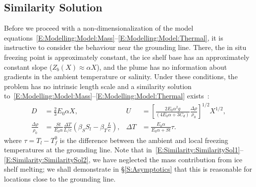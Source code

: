\documentclass[openacc]{rsproca_new}%
\begin{document}
\subsection{Similarity Solution}\label{S:Model:SimilaritySolution}
Before we proceed with a non-dimensionalization of the model equations~\eqref{E:Modelling:Model:Mass}--\eqref{E:Modelling:Model:Thermal}, it is instructive to consider the behaviour near the grounding line. There, the in situ freezing point is approximately constant, the ice shelf base has an approximately constant slope ($Z_b(X) \approx \alpha X$), and the plume has no information about gradients in the ambient temperature or salinity. Under these conditions, the problem has no intrinsic length scale and a similarity solution to~\eqref{E:Modelling:Model:Mass}--\eqref{E:Modelling:Model:Thermal} exists~\citep{Magorrian2016JGeoResOcean}:
\begin{align}
D &= \frac{2}{3}E_0 \alpha X, & U &= \left[\frac{2E_0 \alpha^2 g}{\left(4E_0 \alpha + 3 C_d\right)} \frac{\Delta \rho}{\rho_0}\right]^{1/2}X^{1/2},\label{E:Similarity:SimilaritySol1}\\
 \frac{\Delta \rho}{\rho_0} &= \frac{St}{E_0 \alpha}\frac{\Delta T}{L/c}\left(\beta_S S_l - \beta_T \frac{L}{c}\right), & \Delta T &= \frac{E_0 \alpha}{E_0 \alpha + St}\tau.\label{E:Similarity:SimilaritySol2}
\end{align}
where $\tau = T_l - T_{f}^0$ is the difference between the ambient and local freezing temperatures at the grounding line.  Note that in~\eqref{E:Similarity:SimilaritySol1}--\eqref{E:Similarity:SimilaritySol2}, we have neglected the mass contribution from ice shelf melting; we shall demonstrate in \S\ref{S:Asymptotics} that this is reasonable for locations close to the grounding line.
\end{document}
